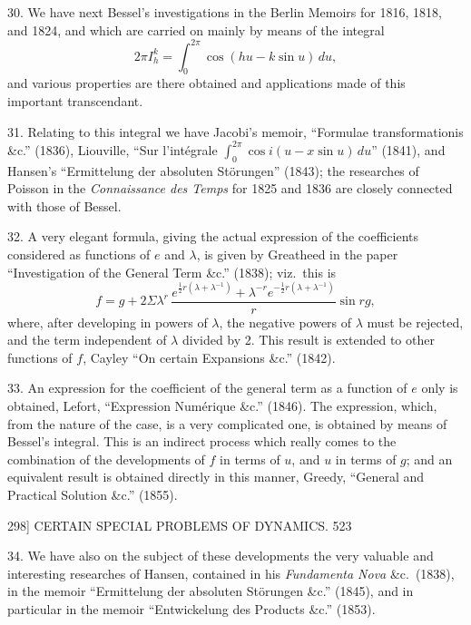 \documentclass[11pt]{article}
\begin{document}
30. We have next Bessel's investigations in the Berlin Memoirs for 1816, 1818, and 1824, and which are carried on mainly by means of the integral
\[ 2\pi I_{h}^{k} = \int_{0}^{2\pi}\cos(hu-k\sin u)\,du, \]
and various properties are there obtained and applications made of this important transcendant.

31. Relating to this integral we have Jacobi's memoir, ``Formulae transformationis \&c.'' (1836), Liouville, ``Sur l'int\'egrale $\int_{0}^{2\pi}\cos i(u-x\sin u)\,du$'' (1841), and Hansen's ``Ermittelung der absoluten St\"orungen'' (1843); the researches of Poisson in the \emph{Connaissance des Temps} for 1825 and 1836 are closely connected with those of Bessel.

32. A very elegant formula, giving the actual expression of the coefficients considered as functions of $e$ and $\lambda$, is given by Greatheed in the paper ``Investigation of the General Term \&c.'' (1838); viz.\ this is
\[ f = g+2\Sigma\lambda^{r}\,\frac{e^{\frac{1}{2}r(\lambda+\lambda^{-1})}+\lambda^{-r}e^{-\frac{1}{2}r(\lambda+\lambda^{-1})}}{r}\sin rg, \]
where, after developing in powers of $\lambda$, the negative powers of $\lambda$ must be rejected, and the term independent of $\lambda$ divided by 2. This result is extended to other functions of $f$, Cayley ``On certain Expansions \&c.'' (1842).

33. An expression for the coefficient of the general term as a function of $e$ only is obtained, Lefort, ``Expression Num\'erique \&c.'' (1846). The expression, which, from the nature of the case, is a very complicated one, is obtained by means of Bessel's integral. This is an indirect process which really comes to the combination of the developments of $f$ in terms of $u$, and $u$ in terms of $g$; and an equivalent result is obtained directly in this manner, Greedy, ``General and Practical Solution \&c.'' (1855).

\newpage
\begin{center}
298] \hfill CERTAIN SPECIAL PROBLEMS OF DYNAMICS. \hfill 523
\end{center}

34. We have also on the subject of these developments the very valuable and interesting researches of Hansen, contained in his \emph{Fundamenta Nova} \&c.\ (1838), in the memoir ``Ermittelung der absoluten St\"orungen \&c.'' (1845), and in particular in the memoir ``Entwickelung des Products \&c.'' (1853).
\end{document}
